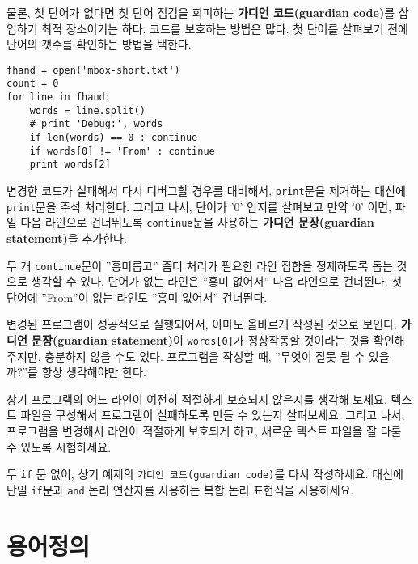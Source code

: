 \begin{enumerate}
물론, 첫 단어가 없다면 첫 단어 점검을 회피하는 {\bf 가디언 코드(guardian code)}를 삽입하기 최적 장소이기는 하다.
코드를 보호하는 방법은 많다. 첫 단어를 살펴보기 전에 단어의 갯수를 확인하는 방법을 택한다.

\beforeverb
\begin{verbatim}
fhand = open('mbox-short.txt')
count = 0
for line in fhand:
    words = line.split()
    # print 'Debug:', words
    if len(words) == 0 : continue
    if words[0] != 'From' : continue
    print words[2]
\end{verbatim}
\afterverb
%

변경한 코드가 실패해서 다시 디버그할 경우를 대비해서, {\tt print}문을 제거하는 대신에 {\tt print}문을 주석 처리한다.
그리고 나서, 단어가 '0' 인지를 살펴보고 만약 '0' 이면, 파일 다음 라인으로 건너뛰도록 {\tt continue}문을 사용하는 {\bf 가디언 문장(guardian statement)}을 추가한다.

두 개 {\tt continue}문이 ''흥미롭고'' 좀더 처리가 필요한 라인 집합을 정제하도록 돕는 것으로 생각할 수 있다.
단어가 없는 라인은 ''흥미 없어서'' 다음 라인으로 건너뛴다. 첫 단어에 ''From''이 없는 라인도 ''흥미 없어서'' 건너뛴다.

변경된 프로그램이 성공적으로 실행되어서, 아마도 올바르게 작성된 것으로 보인다. 
{\bf 가디언 문장(guardian statement)}이 {\tt words[0]}가 정상작동할 것이라는 것을 확인해 주지만, 충분하지 않을 수도 있다.
프로그램을 작성할 때, ''무엇이 잘못 될 수 있을까?''를 항상 생각해야만 한다.

\begin{ex}
상기 프로그램의 어느 라인이 여전히 적절하게 보호되지 않은지를 생각해 보세요.
텍스트 파일을 구성해서 프로그램이 실패하도록 만들 수 있는지 살펴보세요.
그리고 나서, 프로그램을 변경해서 라인이 적절하게 보호되게 하고, 
새로운 텍스트 파일을 잘 다룰 수 있도록 시험하세요.

\end{ex}

\begin{ex}
두 {\tt if} 문 없이, 상기 예제의 {\tt 가디언 코드(guardian code)}를 다시 작성하세요.
대신에 단일 {\tt if}문과 {\tt and} 논리 연산자를 사용하는 복합 논리 표현식을 사용하세요.
\end{ex}


\end{enumerate}



\section{용어정의}


